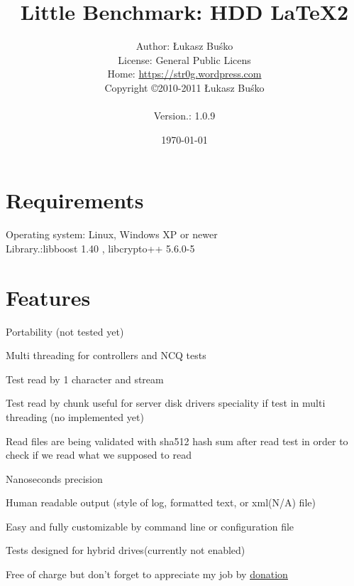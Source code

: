 \documentclass[a4paper]{article}
\begin{document}
\title{Little Benchmark: HDD  \LaTeX2}
\author{Author: Łukasz Buśko
\\License: General Public Licens
\\Home:  \href{https://str0g.wordpress.com}{https://str0g.wordpress.com}
\\Copyright \copyright 2010-2011 Łukasz Buśko\\
\date{\today} Version.: 1.0.9}
\maketitle
\newpage
\tableofcontents
\newpage

\section{Requirements}
Operating system: Linux, Windows XP or newer\\
Library.:libboost 1.40 , libcrypto++ 5.6.0-5
\section{Features}
\begin{itemized}
\item Portability (not tested yet)
\item Multi threading for controllers and NCQ tests
\item Test read by 1 character and stream
\item Test read by chunk useful for server disk drivers speciality if test in multi threading (no implemented yet)
\item Read files are being validated with sha512 hash sum after read test in order to check if we read what we supposed to read
\item Nanoseconds precision
\item Human readable output (style of log, formatted text, or xml(N/A) file)
\item Easy and fully customizable by command line or configuration file
\item Tests designed for hybrid drives(currently not enabled)
\item Free of charge but don't forget to appreciate my job by \href{http://str0g.wordpress.com/about/}{\underline{donation}}
\end{itemized}

\newpage

\newpage


\newpage


\newpages
\end{document}
